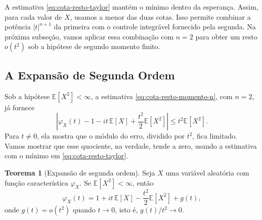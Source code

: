 \documentclass[12pt,portuguese]{article}
\theoremstyle{definition}
\newtheorem{theorem}{Teorema}
\theoremstyle{plainexercise}
\theoremstyle{starredexercise}
\theoremstyle{definition}
\begin{document}
A estimativa \eqref{eq:cota-resto-taylor} mantém o mínimo dentro
da esperança. Assim, para cada valor de $X$, usamos a menor das
duas cotas. Isso permite combinar a potência $|t|^{n+1}$ da
primeira com o controle integrável fornecido pela segunda.
Na próxima subseção, vamos aplicar essa combinação com $n=2$
para obter um resto $o(t^2)$ sob a hipótese de segundo momento finito.

\subsection{A Expansão de Segunda Ordem}\label{subsec:segunda-ordem}

Sob a hipótese $\mathbb{E}[X^2]<\infty$, a estimativa
\eqref{eq:cota-resto-momento-n}, com $n=2$, já fornece
\[
\left|\varphi_X(t)-1-it\,\mathbb{E}[X]
+\frac{t^2}{2}\mathbb{E}[X^2]\right|
\leqslant t^2\mathbb{E}[X^2].
\]
Para $t\neq0$, ela mostra que o módulo do erro, dividido por $t^2$,
fica limitado.
Vamos mostrar que esse quociente, na verdade, tende a zero,
usando a estimativa com o mínimo em \eqref{eq:cota-resto-taylor}.

\begin{theorem}[Expansão de segunda ordem]\label{thm:taylor-segunda-ordem}
\label{thm:man-expansao-segunda-ordem}
Seja $X$ uma variável aleatória com função característica $\varphi_X$.
Se $\mathbb{E}[X^2]<\infty$, então
\[
\varphi_X(t)
=1+it\,\mathbb{E}[X]-\frac{t^2}{2}\mathbb{E}[X^2]+g(t),
\]
onde $g(t)=o(t^2)$ quando $t\to0$, isto é,
$g(t)/t^2\to0$.
\end{theorem}
\end{document}
